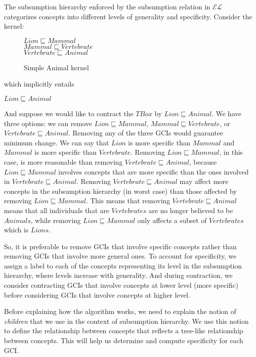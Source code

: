 The subsumption hierarchy enforced by the subsumption relation in $\mathcal{EL}$ categorizes concepts into different levels of generality and specificity. Consider the kernel:%
\begin{figure}[h]
\begin{center}
$Lion \sqsubseteq Mammal$\\
$Mammal \sqsubseteq Vertebrate$\\
$Vertebrate \sqsubseteq Animal$
\end{center}
\caption{Simple Animal kernel}
\label{fig:AnimalKernel}
\end{figure}

\newpage

which implicitly entails
\begin{center}
$Lion \sqsubseteq Animal$
\end{center}
And suppose we would like to contract the $TBox$ by $Lion \sqsubseteq Animal$. We have three options: we can remove $Lion \sqsubseteq Mammal$, $Mammal \sqsubseteq Vertebrate$, or $Vertebrate \sqsubseteq Animal$. Removing any of the three GCIs would guarantee minimum change. We can say that $Lion$ is more specific than $Mammal$ and $Mammal$ is more specific than $Vertebrate$. Removing $Lion \sqsubseteq Mammal$, in this case, is more reasonable than removing $Vertebrate \sqsubseteq Animal$, because $Lion \sqsubseteq Mammal$ involves concepts that are more specific than the ones involved in $Vertebrate \sqsubseteq Animal$. Removing $Vertebrate \sqsubseteq Animal$ may affect more concepts in the subsumption hierarchy (in worst case) than those affected by removing $Lion \sqsubseteq Mammal$. This means that removing $Vertebrate \sqsubseteq Animal$ means that all individuals that are $Vertebrates$ are no longer believed to be $Animals$, while removing $Lion \sqsubseteq Mammal$ only affects a subset of $Vertebrates$ which is $Lions$.

So, it is preferable to remove GCIs that involve specific concepts rather than removing GCIs that involve more general ones. To account for specificity, we assign a label to each of the concepts representing its level in the subsumption hierarchy, where levels increase with generality. And during contraction, we consider contracting GCIs that involve concepts at lower level (more specific) before considering GCIs that involve concepts at higher level.

Before explaining how the algorithm works, we need to explain the notion of \textit{children} that we use in the context of subsumption hierarchy. We use this notion to define the relationship between concepts that reflects a tree-like relationship between concepts. This will help us determine and compute specificity for each GCI.

